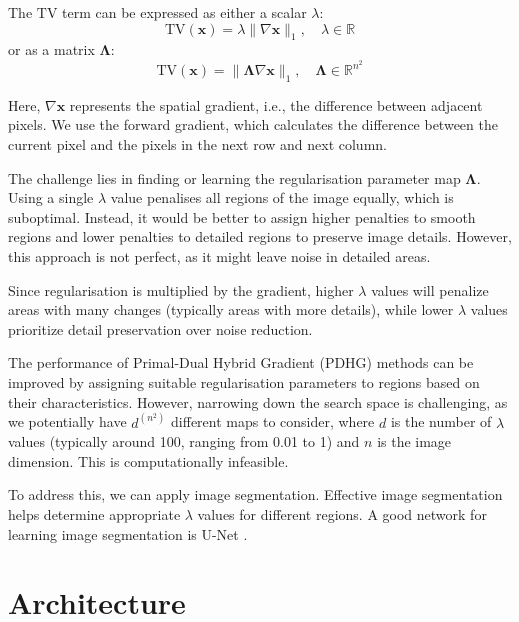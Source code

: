 \documentclass[12pt]{article}
\begin{document}
 The $\text{TV}$ term can be expressed as either a scalar $\lambda$:
$$
\text{TV}(\mathbf{x}) = \lambda \| \nabla \mathbf{x} \|_1, \quad \lambda \in \mathbb{R}
$$
or as a matrix $\mathbf{\Lambda}$:
$$
\text{TV}(\mathbf{x}) = \| \mathbf{\Lambda} \nabla \mathbf{x} \|_1, \quad \mathbf{\Lambda} \in \mathbb{R}^{n^2}
$$

Here, $\nabla \mathbf{x}$ represents the spatial gradient, i.e., the difference between adjacent pixels. We use the forward gradient, which calculates the difference between the current pixel and the pixels in the next row and next column.

The challenge lies in finding or learning the regularisation parameter map $\mathbf{\Lambda}$. Using a single $\lambda$ value penalises all regions of the image equally, which is suboptimal. Instead, it would be better to assign higher penalties to smooth regions and lower penalties to detailed regions to preserve image details. However, this approach is not perfect, as it might leave noise in detailed areas.

Since regularisation is multiplied by the gradient, higher $\lambda$ values will penalize areas with many changes (typically areas with more details), while lower $\lambda$ values prioritize detail preservation over noise reduction.

The performance of Primal-Dual Hybrid Gradient (PDHG) methods can be improved by assigning suitable regularisation parameters to regions based on their characteristics. However, narrowing down the search space is challenging, as we potentially have $d^{(n^2)}$ different maps to consider, where $d$ is the number of $\lambda$ values (typically around 100, ranging from 0.01 to 1) and $n$ is the image dimension. This is computationally infeasible.

To address this, we can apply image segmentation. Effective image segmentation helps determine appropriate $\lambda$ values for different regions. A good network for learning image segmentation is U-Net \cite{ronneberger2015unet}.



\section{Architecture}
\end{document}
